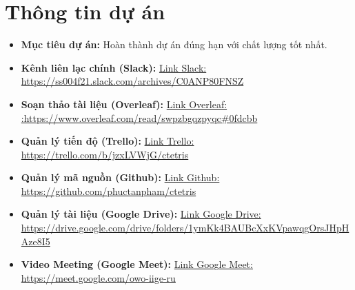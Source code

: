 \documentclass[11pt,a4paper]{article}
\begin{document}
\section*{Thông tin dự án} 
\begin{itemize}[label=--, itemsep=2pt]
    \item \textbf{Mục tiêu dự án:} Hoàn thành dự án đúng hạn với chất lượng tốt nhất.
    \item \textbf{Kênh liên lạc chính (Slack):} \href{https://ss004f21.slack.com/archives/C0ANP80FNSZ}{Link Slack:}
    \url{https://ss004f21.slack.com/archives/C0ANP80FNSZ}
    \item \textbf{Soạn thảo tài liệu (Overleaf):} \href{https://www.overleaf.com/read/swpzbgqzpyqc#0fdcbb}{Link Overleaf:}
    \url{:https://www.overleaf.com/read/swpzbgqzpyqc#0fdcbb}
    \item \textbf{Quản lý tiến độ (Trello):} \href{https://trello.com/b/jzxLVWjG/ctetris}{Link Trello:}
    \url{https://trello.com/b/jzxLVWjG/ctetris}
    \item \textbf{Quản lý mã nguồn (Github):} \href{https://github.com/phuctanpham/ctetris}{Link Github:}
    \url{https://github.com/phuctanpham/ctetris}
    \item \textbf{Quản lý tài liệu (Google Drive):} \href{https://drive.google.com/drive/folders/1ymKk4BAUBcXxKVpawqgOrsJHpHAze8I5}{Link Google Drive:}
    \url{https://drive.google.com/drive/folders/1ymKk4BAUBcXxKVpawqgOrsJHpHAze8I5}
    \item \textbf{Video Meeting (Google Meet):} \href{https://meet.google.com/owo-iige-rum}{Link Google Meet:}
    \url{https://meet.google.com/owo-iige-ru}
\end{itemize}

\label{LastPageTeamContractValidation}
\end{document}
